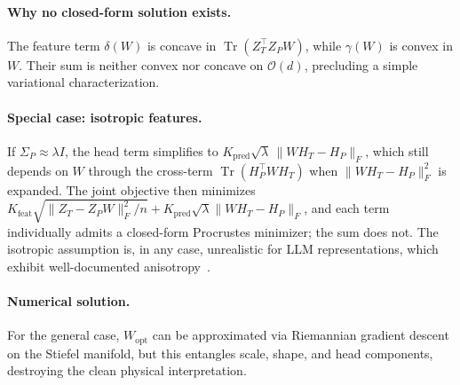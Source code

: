 \paragraph{Why no closed-form solution exists.}
The feature term $\delta(W)$ is concave in $\operatorname{Tr}(Z_T^\top Z_P W)$, while $\gamma(W)$ is convex in $W$. Their sum is neither convex nor concave on $\mathcal{O}(d)$, precluding a simple variational characterization.

\paragraph{Special case: isotropic features.}
If $\Sigma_P \approx \lambda I$, the head term simplifies to $K_{\mathrm{pred}}\sqrt{\lambda}\,\|W H_T - H_P\|_F$, which still depends on $W$ through the cross-term $\operatorname{Tr}(H_P^\top W H_T)$ when $\|W H_T - H_P\|_F^2$ is expanded. The joint objective then minimizes $K_{\mathrm{feat}}\sqrt{\|Z_T - Z_P W\|_F^2/n} + K_{\mathrm{pred}}\sqrt{\lambda}\|W H_T - H_P\|_F$, and each term individually admits a closed-form Procrustes minimizer; the sum does not. The isotropic assumption is, in any case, unrealistic for LLM representations, which exhibit well-documented anisotropy~\cite{ethayarajh2019contextual}.

\paragraph{Numerical solution.}
For the general case, $W_{\mathrm{opt}}$ can be approximated via Riemannian gradient descent on the Stiefel manifold, but this entangles scale, shape, and head components, destroying the clean physical interpretation.


